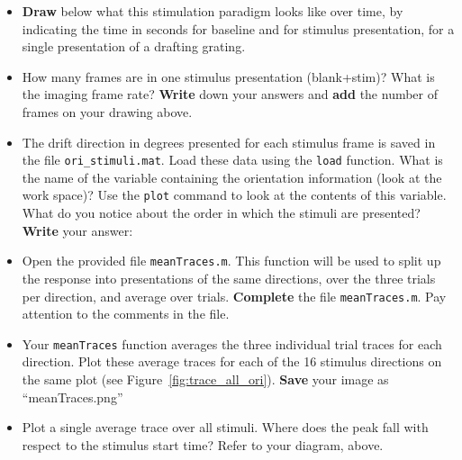 \documentclass[paper=a4, fontsize=11pt]{article} %
\numberwithin{equation}{section} %
\numberwithin{figure}{section} %
\numberwithin{table}{section} %
\begin{document}
\begin{itemize}
\item \textbf{Draw} below what this stimulation paradigm looks like over time, by indicating the time in seconds for baseline and for stimulus presentation, for a single presentation of a drafting grating.
  \vspace{2.5in}
\item How many frames are in one stimulus presentation (blank+stim)? What is the imaging frame rate? \textbf{Write} down your answers and \textbf{add} the number of frames on your drawing above.
\item The drift direction in degrees presented for each stimulus frame is saved in the file \texttt{ori\_stimuli.mat}.
  Load these data using the \texttt{load} function. What is the name of the variable containing the orientation information (look at the work space)?
  Use the \texttt{plot} command to look at the contents of this variable. What do you notice about the order in which the stimuli are presented? 
  \textbf{Write} your answer:\\
  \vspace{2in}
\item Open the provided file \texttt{meanTraces.m}. This function will be used to split up the response into presentations of the same directions, over the three trials per direction, and average over trials. \textbf{Complete} the file \texttt{meanTraces.m}. Pay attention to the comments in the file.
\item Your \texttt{meanTraces} function averages the three individual trial traces for each direction. 
 Plot these average traces for each of the 16 stimulus directions on the same plot (see Figure~\ref{fig:trace_all_ori}). \textbf{Save} your image as ``meanTraces.png''
\item Plot a single average trace over all stimuli. Where does the peak fall with respect to the stimulus start time? Refer to your diagram, above.
\end{itemize}
\end{document}

